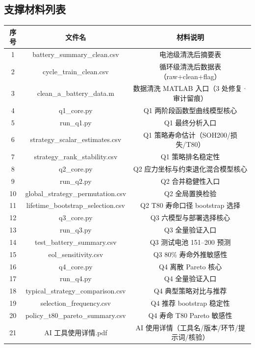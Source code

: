 \documentclass[withoutpreface,bwprint]{cumcmthesis}
\begin{document}
\begin{appendices}
\section{支撑材料列表}
\begin{table}[H]
\centering
\small
\begin{tabular}{|c|c|c|}
\hline
序号 & 文件名 & 材料说明 \\ \hline
1 & battery\_summary\_clean.csv & 电池级清洗后摘要表 \\ \hline
2 & cycle\_train\_clean.csv & 循环级清洗后数据表（raw+clean+flag） \\ \hline
3 & clean\_a\_battery\_data.m & 数据清洗 MATLAB 入口（3 处修复·审计留痕） \\ \hline
4 & q1\_core.py & Q1 两阶段函数型曲线模型核心 \\ \hline
5 & run\_q1.py & Q1 最终分析入口 \\ \hline
6 & strategy\_scalar\_estimates.csv & Q1 策略寿命估计（SOH200/损失/T80） \\ \hline
7 & strategy\_rank\_stability.csv & Q1 策略排名稳定性 \\ \hline
8 & q2\_core.py & Q2 应力坐标与约束退化混合模型核心 \\ \hline
9 & run\_q2.py & Q2 合并稳健性入口 \\ \hline
10 & global\_strategy\_permutation.csv & Q2 全局置换检验 \\ \hline
11 & lifetime\_bootstrap\_selection.csv & Q2 T80 寿命口径 bootstrap 选择 \\ \hline
12 & q3\_core.py & Q3 六模型与部署选择核心 \\ \hline
13 & run\_q3.py & Q3 全量验证入口 \\ \hline
14 & test\_battery\_summary.csv & Q3 测试电池 151--200 预测 \\ \hline
15 & eol\_sensitivity.csv & Q3 80\% 寿命外推敏感性 \\ \hline
16 & q4\_core.py & Q4 离散 Pareto 核心 \\ \hline
17 & run\_q4.py & Q4 全量验证入口 \\ \hline
18 & typical\_strategy\_comparison.csv & Q4 典型策略对比与推荐 \\ \hline
19 & selection\_frequency.csv & Q4 推荐 bootstrap 稳定性 \\ \hline
20 & policy\_t80\_pareto\_summary.csv & Q4 寿命 T80 Pareto 敏感性 \\ \hline
21 & AI 工具使用详情.pdf & AI 使用详情（工具名/版本/环节/提示词/核验） \\ \hline
\end{tabular}
\end{table}


\end{appendices}
\end{document}
